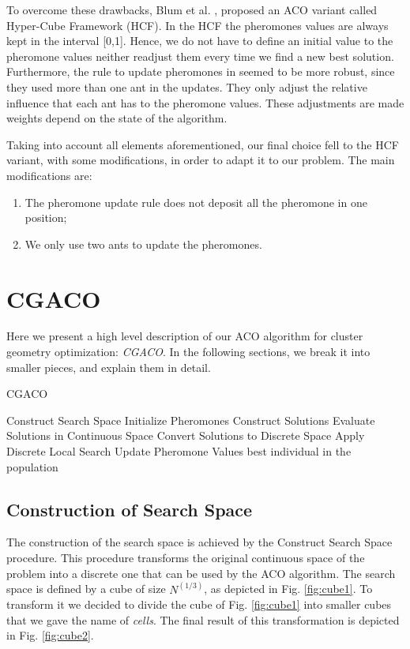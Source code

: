 	To overcome these drawbacks, Blum et al. \cite{blum04}, proposed an ACO variant called Hyper-Cube Framework (HCF). In the HCF the pheromones values are always kept in the interval [0,1]. Hence, we do not have to define an initial value to the pheromone values neither readjust them every time we find a new best solution. Furthermore, the rule to update pheromones in \cite{blum04} seemed to be more robust, since they used more than one ant in the updates. They only adjust the relative influence that each ant has to the pheromone values. These adjustments are made weights depend on the state of the algorithm.

	Taking into account all elements aforementioned, our final choice fell to the HCF variant, with some modifications, in order to adapt it to our problem. The main modifications are:
	\begin{enumerate}
		\item The pheromone update rule does not deposit all the pheromone in one position;
		\item We only use two ants to update the pheromones.
	\end{enumerate}
	\pagebreak
	\section{CGACO}
	Here we present a high level description of our ACO algorithm for cluster geometry optimization: \emph{CGACO}. In the following sections, we break it into smaller pieces, and explain them in detail.
	
	\begin{algorithm}
		\caption{CGACO}
		\label{alg:cgaco}
		\begin{algorithmic}
		\STATE Construct Search Space
		\STATE Initialize Pheromones
			\STATE Construct Solutions
			\STATE Evaluate Solutions in Continuous Space
			\STATE Convert Solutions to Discrete Space
			\STATE Apply Discrete Local Search
			\STATE Update Pheromone Values
		\ENDWHILE
		\RETURN best individual in the population
		\end{algorithmic}
	\end{algorithm}
	
	\subsection{Construction of Search Space}
	
	The construction of the search space is achieved by the Construct Search Space procedure. This procedure transforms the original continuous space of the problem into a discrete one that can be used by the ACO algorithm. 
	The search space is defined by a cube of size $N^{(1/3)}$, as depicted in Fig. \ref{fig:cube1}. To transform it we decided to divide the cube of Fig. \ref{fig:cube1} into smaller cubes that we gave the name of \emph{cells}. The final result of this transformation is depicted in Fig. \ref{fig:cube2}.  
	
